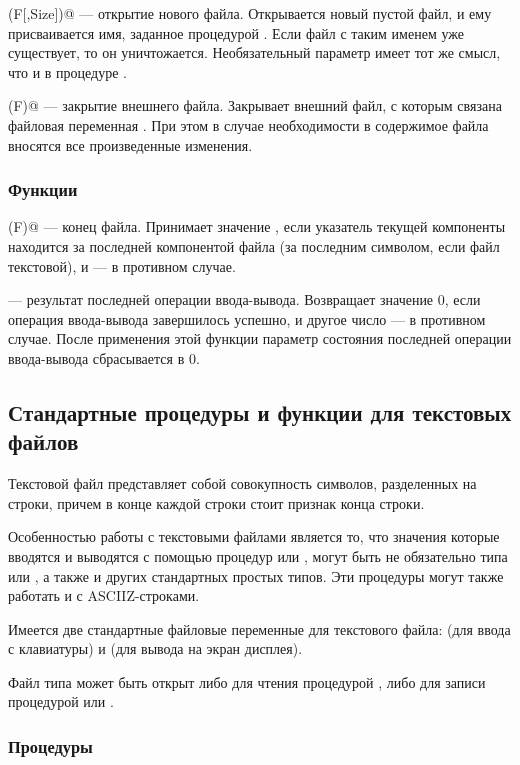 \documentclass[12pt,a4paper]{article}
\theoremstyle{plain}
\theoremstyle{definition}
\theoremstyle{remark}
\begin{document}
\verb@Rewrite(F[,Size])@ --- открытие нового файла. Открывается новый пустой файл, и ему присваивается имя, заданное процедурой \verb@Assign@. Если файл с таким именем уже существует, то он уничтожается. Необязательный параметр \verb@Size@ имеет тот же смысл, что и в процедуре \verb@Reset@.

\verb@Close(F)@ --- закрытие внешнего файла. Закрывает внешний файл, с которым связана файловая переменная \verb@F@. При этом в случае необходимости в содержимое файла вносятся все произведенные изменения.

\subsubsection*{Функции}

\verb@Eof(F)@ --- конец файла. Принимает значение \verb@true@, если указатель текущей компоненты находится за последней компонентой файла (за последним символом, если файл текстовой), и \verb@false@ --- в противном случае.

\verb@IOResult@ --- результат последней операции ввода-вывода. Возвращает значение 0, если операция ввода-вывода завершилось успешно, и другое число --- в противном случае. После применения этой функции параметр состояния последней операции ввода-вывода сбрасывается в 0. 

\subsection{Стандартные процедуры и функции для текстовых файлов}

Текстовой файл представляет собой совокупность символов, разделенных на строки, причем в конце каждой строки стоит признак конца строки.

Особенностью работы с текстовыми файлами является то, что значения которые вводятся и выводятся с помощью процедур \verb@read@ или \verb@write@, могут быть не обязательно типа \verb@Char@ или \verb@String@, а также и других стандартных простых типов. Эти процедуры могут также работать и с ASCIIZ-строками.

Имеется две стандартные файловые переменные для текстового файла: \verb@input@ (для ввода с клавиатуры) и \verb@output@ (для вывода на экран дисплея).

Файл типа \verb@Text@ может быть открыт либо для чтения процедурой \verb@reset@, либо для записи процедурой \verb@rewrite@ или \verb@append@.

\subsubsection*{Процедуры}
\end{document}
